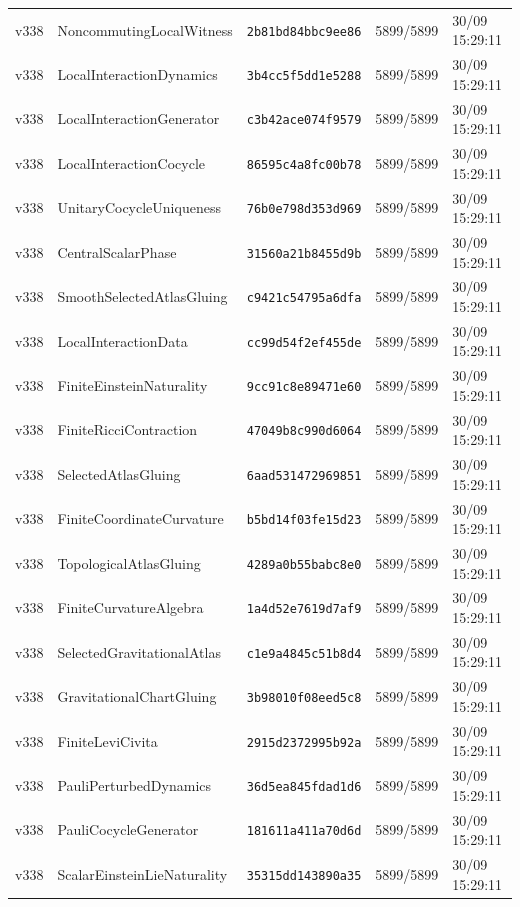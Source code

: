 \documentclass[11pt]{article}
\theoremstyle{definition}\newtheorem{deriv}{Derivation}
\begin{document}
{\begin{longtable}{@{}lllll@{}}
v338 & NoncommutingLocalWitness & \texttt{2b81bd84bbc9ee86} & 5899/5899 & 30/09 15:29:11 \\
v338 & LocalInteractionDynamics & \texttt{3b4cc5f5dd1e5288} & 5899/5899 & 30/09 15:29:11 \\
v338 & LocalInteractionGenerator & \texttt{c3b42ace074f9579} & 5899/5899 & 30/09 15:29:11 \\
v338 & LocalInteractionCocycle & \texttt{86595c4a8fc00b78} & 5899/5899 & 30/09 15:29:11 \\
v338 & UnitaryCocycleUniqueness & \texttt{76b0e798d353d969} & 5899/5899 & 30/09 15:29:11 \\
v338 & CentralScalarPhase & \texttt{31560a21b8455d9b} & 5899/5899 & 30/09 15:29:11 \\
v338 & SmoothSelectedAtlasGluing & \texttt{c9421c54795a6dfa} & 5899/5899 & 30/09 15:29:11 \\
v338 & LocalInteractionData & \texttt{cc99d54f2ef455de} & 5899/5899 & 30/09 15:29:11 \\
v338 & FiniteEinsteinNaturality & \texttt{9cc91c8e89471e60} & 5899/5899 & 30/09 15:29:11 \\
v338 & FiniteRicciContraction & \texttt{47049b8c990d6064} & 5899/5899 & 30/09 15:29:11 \\
v338 & SelectedAtlasGluing & \texttt{6aad531472969851} & 5899/5899 & 30/09 15:29:11 \\
v338 & FiniteCoordinateCurvature & \texttt{b5bd14f03fe15d23} & 5899/5899 & 30/09 15:29:11 \\
v338 & TopologicalAtlasGluing & \texttt{4289a0b55babc8e0} & 5899/5899 & 30/09 15:29:11 \\
v338 & FiniteCurvatureAlgebra & \texttt{1a4d52e7619d7af9} & 5899/5899 & 30/09 15:29:11 \\
v338 & SelectedGravitationalAtlas & \texttt{c1e9a4845c51b8d4} & 5899/5899 & 30/09 15:29:11 \\
v338 & GravitationalChartGluing & \texttt{3b98010f08eed5c8} & 5899/5899 & 30/09 15:29:11 \\
v338 & FiniteLeviCivita & \texttt{2915d2372995b92a} & 5899/5899 & 30/09 15:29:11 \\
v338 & PauliPerturbedDynamics & \texttt{36d5ea845fdad1d6} & 5899/5899 & 30/09 15:29:11 \\
v338 & PauliCocycleGenerator & \texttt{181611a411a70d6d} & 5899/5899 & 30/09 15:29:11 \\
v338 & ScalarEinsteinLieNaturality & \texttt{35315dd143890a35} & 5899/5899 & 30/09 15:29:11 \\

\end{longtable}}
\end{document}
